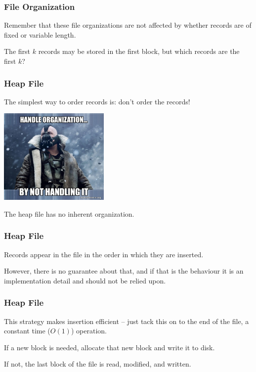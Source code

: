 \begin{frame}
\frametitle{File Organization}


Remember that these file organizations are not affected by whether records are of fixed or variable length.

The first $k$ records may be stored in the first block, but which records are the first $k$?

\end{frame}


\begin{frame}
\frametitle{Heap File}

The simplest way to order records is: don't order the records! 

\begin{center}
	\includegraphics[width=0.4\textwidth]{images/bane.jpg}
\end{center}

The heap file has no inherent organization. 

\end{frame}


\begin{frame}
\frametitle{Heap File}

Records appear in the file in the order in which they are inserted. 

However, there is no guarantee about that, and if that is the behaviour it is an implementation detail and should not be relied upon. 

\end{frame}


\begin{frame}
\frametitle{Heap File}

This strategy makes insertion efficient -- just tack this on to the end of the file, a constant time ($O(1)$) operation. 

If a new block is needed, allocate that new block and write it to disk. 

If not, the last block of the file is read, modified, and written.

\end{frame}


